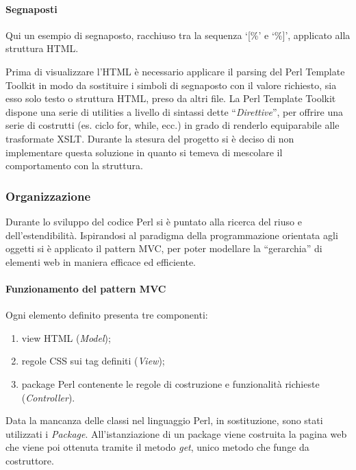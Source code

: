 \paragraph*{Segnaposti} Qui un esempio di segnaposto, racchiuso tra la sequenza `[\%' e `\%]', applicato alla struttura HTML.


Prima di visualizzare l'HTML \`e necessario applicare il parsing del Perl Template Toolkit in modo da sostituire i simboli di segnaposto con il valore richiesto, sia esso solo testo o struttura HTML, preso da altri file.
La Perl Template Toolkit dispone una serie di utilities a livello di sintassi dette ``\textit{Direttive}'', per offrire una serie di costrutti (es. ciclo for, while, ecc.) in grado di renderlo equiparabile alle trasformate XSLT. Durante la stesura del progetto si \`e deciso di non implementare questa soluzione in quanto si temeva di mescolare il comportamento con la struttura.


\subsubsection{Organizzazione}
Durante lo sviluppo del codice Perl si \`e puntato alla ricerca del riuso e dell'estendibilit\`a. Ispirandosi al paradigma della programmazione orientata agli oggetti si \`e applicato il pattern MVC, per poter modellare la ``gerarchia'' di elementi web in maniera efficace ed efficiente.

\paragraph*{Funzionamento del pattern MVC}Ogni elemento definito presenta tre componenti:
\begin{enumerate}
    \item view HTML (\textit{Model});
    \item regole CSS sui tag definiti (\textit{View});
    \item package Perl contenente le regole di costruzione e funzionalit\`a richieste (\textit{Controller}).
\end{enumerate}

Data la mancanza delle classi nel linguaggio Perl, in sostituzione, sono stati utilizzati i \textit{Package}. All'istanziazione di un package viene costruita la pagina web che viene poi ottenuta tramite il metodo \textit{get}, unico metodo che funge da costruttore.

